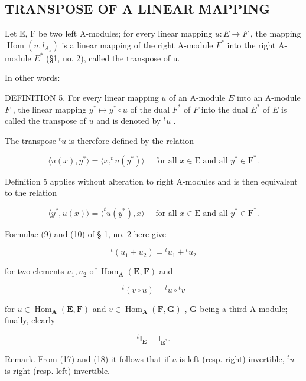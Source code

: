 \subsection{TRANSPOSE OF A LINEAR MAPPING}

Let E, F be two left A-modules; for every linear mapping \(u: E \to F\) , the mapping \(\operatorname{Hom}(u, l_{A_s})\) is a linear mapping of the right A-module \(F^*\) into the right A-module \(E^*\) (§1, no. 2), called the transpose of u.

In other words:

DEFINITION 5. For every linear mapping \(u\) of an A-module \(E\) into an A-module \(F\) , the linear mapping \(y^{*} \mapsto y^{*} \circ u\) of the dual \(F^{*}\) of \(F\) into the dual \(E^{*}\) of \(E\) is called the transpose of \(u\) and is denoted by \(^{t}u\) .

The transpose \(^{t}u\) is therefore defined by the relation

\[
\langle u (x), y ^ {*} \rangle = \langle x, ^ {t} u (y ^ {*}) \rangle \quad \text { for   all } x \in \mathrm{E} \text { and   all } y ^ {*} \in \mathrm{F} ^ {*}.\tag{15}
\]

Definition 5 applies without alteration to right A-modules and is then equivalent to the relation

\[
\langle y ^ {*}, u (x) \rangle = \langle^ {t} u (y ^ {*}), x \rangle \quad \text { for   all } x \in \mathrm{E} \text { and   all } y ^ {*} \in \mathrm{F} ^ {*}.
\]

Formulae (9) and (10) of § 1, no. 2 here give

\[
{ } ^ { t } ( u _ { 1 } + u _ { 2 } ) = { } ^ { t } u _ { 1 } + { } ^ { t } u _ { 2 }\tag{16}
\]

for two elements \(u_{1}, u_{2}\) of \(\operatorname{Hom}_{\mathbf{A}}(\mathbf{E}, \mathbf{F})\) and

\[
{ } ^ { t } ( v \circ u ) = { } ^ { t } u \circ { } ^ { t } v\tag{17}
\]

for \(u \in \operatorname{Hom}_{\mathbf{A}}(\mathbf{E}, \mathbf{F})\) and \(v \in \operatorname{Hom}_{\mathbf{A}}(\mathbf{F}, \mathbf{G})\) , \(\mathbf{G}\) being a third A-module; finally, clearly

\[
{ } ^ { t } \mathbf { l } _ { \mathbf { E } } = \mathbf { l } _ { \mathbf { E } ^ { * } } .\tag{18}
\]

Remark. From (17) and (18) it follows that if \(u\) is left (resp. right) invertible, \(^{t}u\) is right (resp. left) invertible.

